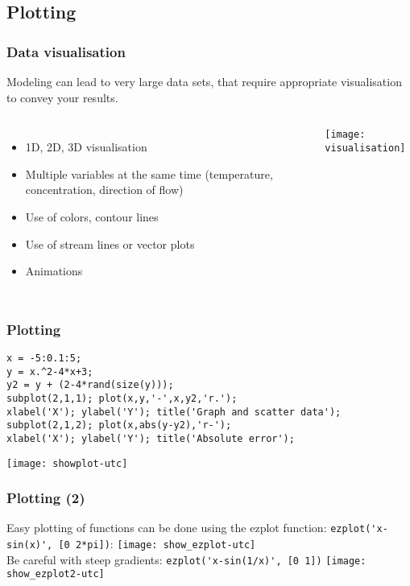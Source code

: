 \documentclass[11pt,table,final,fleqn,xcolor={usenames,dvipsnames}]{beamer}
\begin{document}
\subsection*{Plotting}
\begin{frame}
 \frametitle{Data visualisation}
 Modeling can lead to very large data sets, that require appropriate visualisation to convey your results.
 \begin{columns}
    \begin{itemize}
      \item 1D, 2D, 3D visualisation
      \item Multiple variables at the same time (temperature, concentration, direction of flow)
      \item Use of colors, contour lines
      \item Use of stream lines or vector plots
      \item Animations
    \end{itemize}
   \centering\texttt{[image: visualisation]}
 \end{columns}
\end{frame}

\begin{frame}[fragile]
  \frametitle{Plotting}
  \begin{lstlisting}
x = -5:0.1:5;
y = x.^2-4*x+3;
y2 = y + (2-4*rand(size(y)));
subplot(2,1,1); plot(x,y,'-',x,y2,'r.');
xlabel('X'); ylabel('Y'); title('Graph and scatter data');
subplot(2,1,2); plot(x,abs(y-y2),'r-');
xlabel('X'); ylabel('Y'); title('Absolute error');
  \end{lstlisting}
  \centering\texttt{[image: showplot-utc]}
\end{frame}

\begin{frame}[fragile]
  \frametitle{Plotting (2)}
  Easy plotting of functions can be done using the ezplot function: \lstinline$ezplot('x-sin(x)', [0 2*pi])$:
  \texttt{[image: show\_ezplot-utc]}\\
  Be careful with steep gradients: \lstinline$ezplot('x-sin(1/x)', [0 1])$%
  \texttt{[image: show\_ezplot2-utc]}
\end{frame}
\end{document}
